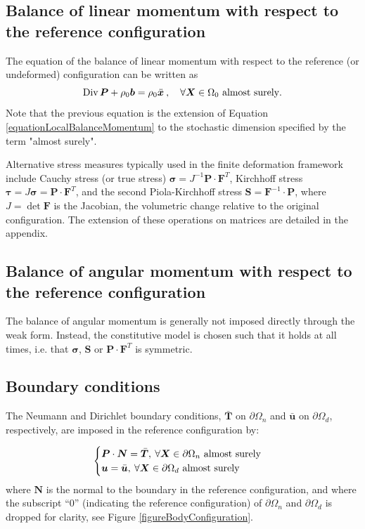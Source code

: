 \documentclass[oneside,11pt,times]{book}
\begin{document}
\subsection{Balance of linear momentum with respect to the reference configuration}
 \label{subsectionBalanceMomentum}

The equation of the balance of linear momentum with respect to the reference (or undeformed) configuration can be written as
%
\begin{equation} \label{equationLocalBalanceMomentumStochastic}
 \text{Div} \, \bm{P} + \rho_0  \bm{b} = \rho_0 \ddot{\bm{x}} \: , \quad \forall \bm{X} \in \Omega_0 \ \textnormal{almost surely}.
\end{equation}
%
Note that the previous equation is the extension of Equation \ref{equationLocalBalanceMomentum} to the stochastic dimension specified by the term "almost surely".

Alternative stress measures typically used in the finite deformation framework include Cauchy stress (or true stress) $\bm{\sigma} = J^{-1} \bm{P} \cdot \bm{F}^{T}$, Kirchhoff stress $\bm{\tau} = J \bm{\sigma} = \bm{P} \cdot \bm{F}^{T}$, and the second Piola-Kirchhoff stress $\bm{S} = \bm{F}^{-1} \cdot \bm{P}$, where $J = \det \bm{F}$ is the Jacobian, the volumetric change relative to the original configuration. The extension of these operations on matrices are detailed in the appendix.

\subsection{Balance of angular momentum with respect to the reference configuration}

The balance of angular momentum is generally not imposed directly through the weak form. Instead, the constitutive model is chosen such that it holds at all times, i.e. that $\bm{\sigma}$, $\bm{S}$ or $\bm{P}\cdot \bm{F}^{T}$ is symmetric.


\subsection{Boundary conditions}

The Neumann and Dirichlet boundary conditions, $\bar{\bm{T}}$ on $\partial \Omega_n$ and $\bar{\bm{u}}$ on $\partial \Omega_d$, respectively, are imposed in the reference configuration by:

\begin{equation}
\begin{cases}
\bm{P}\cdot\bm{N}=\bar{\bm{T}}, \: \forall \bm{X} \in \partial \Omega_n \ \textnormal{almost surely} \\
\bm{u}=\bar{\bm{u}}, \: \forall \bm{X} \in \partial \Omega_d \ \textnormal{almost surely}\\
\end{cases}
\label{boundaryconditions}
\end{equation}
where $\bm{N}$ is the normal to the boundary in the reference configuration, and where the subscript ``$0$'' (indicating the reference configuration) of $\partial \Omega_n$ and $\partial \Omega_d$ is dropped for clarity, see Figure \ref{figureBodyConfiguration}.
\end{document}
